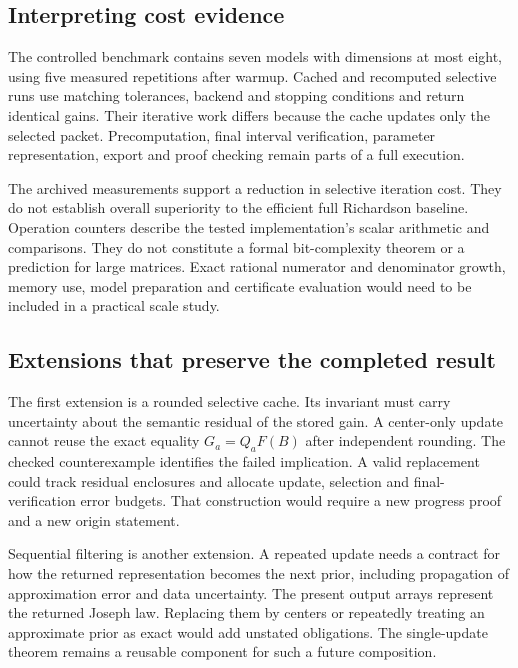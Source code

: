 \subsection{Interpreting cost evidence}
The controlled benchmark contains seven models with dimensions at most eight, using five measured repetitions after warmup. Cached and recomputed selective runs use matching tolerances, backend and stopping conditions and return identical gains. Their iterative work differs because the cache updates only the selected packet. Precomputation, final interval verification, parameter representation, export and proof checking remain parts of a full execution.

The archived measurements support a reduction in selective iteration cost. They do not establish overall superiority to the efficient full Richardson baseline. Operation counters describe the tested implementation's scalar arithmetic and comparisons. They do not constitute a formal bit-complexity theorem or a prediction for large matrices. Exact rational numerator and denominator growth, memory use, model preparation and certificate evaluation would need to be included in a practical scale study.


\subsection{Extensions that preserve the completed result}
The first extension is a rounded selective cache. Its invariant must carry uncertainty about the semantic residual of the stored gain. A center-only update cannot reuse the exact equality $G_a=Q_aF(B)$ after independent rounding. The checked counterexample identifies the failed implication. A valid replacement could track residual enclosures and allocate update, selection and final-verification error budgets. That construction would require a new progress proof and a new origin statement.

Sequential filtering is another extension. A repeated update needs a contract for how the returned representation becomes the next prior, including propagation of approximation error and data uncertainty. The present output arrays represent the returned Joseph law. Replacing them by centers or repeatedly treating an approximate prior as exact would add unstated obligations. The single-update theorem remains a reusable component for such a future composition.

